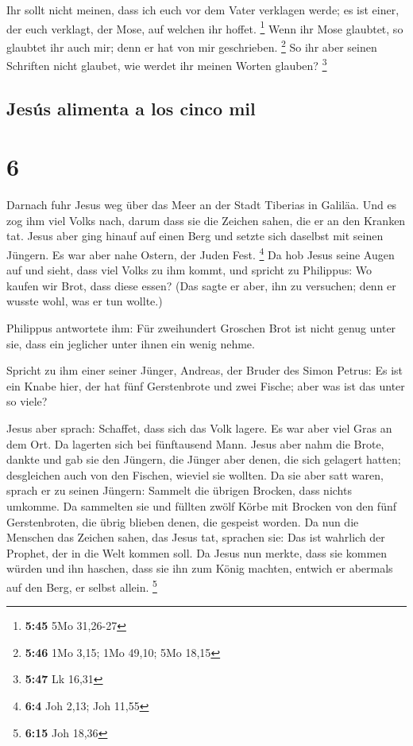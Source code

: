  Ihr sollt nicht meinen, dass ich euch vor dem Vater
verklagen werde; es ist einer, der euch verklagt, der Mose, auf welchen
ihr hoffet. \footnote{\textbf{5:45} 5Mo 31,26-27}  Wenn
ihr Mose glaubtet, so glaubtet ihr auch mir; denn er hat von mir
geschrieben. \footnote{\textbf{5:46} 1Mo 3,15; 1Mo 49,10; 5Mo 18,15}
 So ihr aber seinen Schriften nicht glaubet, wie werdet
ihr meinen Worten glauben? \footnote{\textbf{5:47} Lk 16,31}

\hypertarget{jesuxfas-alimenta-a-los-cinco-mil}{%
\subsection{Jesús alimenta a los cinco
mil}\label{jesuxfas-alimenta-a-los-cinco-mil}}

\hypertarget{section-5}{%
\section{6}\label{section-5}}

 Darnach fuhr Jesus weg über das Meer an der Stadt
Tiberias in Galiläa.  Und es zog ihm viel Volks nach,
darum dass sie die Zeichen sahen, die er an den Kranken tat.
 Jesus aber ging hinauf auf einen Berg und setzte sich
daselbst mit seinen Jüngern.  Es war aber nahe Ostern, der
Juden Fest. \footnote{\textbf{6:4} Joh 2,13; Joh 11,55} 
Da hob Jesus seine Augen auf und sieht, dass viel Volks zu ihm kommt,
und spricht zu Philippus: Wo kaufen wir Brot, dass diese essen?
 (Das sagte er aber, ihn zu versuchen; denn er wusste
wohl, was er tun wollte.)

 Philippus antwortete ihm: Für zweihundert Groschen Brot
ist nicht genug unter sie, dass ein jeglicher unter ihnen ein wenig
nehme.

 Spricht zu ihm einer seiner Jünger, Andreas, der Bruder
des Simon Petrus:  Es ist ein Knabe hier, der hat fünf
Gerstenbrote und zwei Fische; aber was ist das unter so viele?

 Jesus aber sprach: Schaffet, dass sich das Volk lagere.
Es war aber viel Gras an dem Ort. Da lagerten sich bei fünftausend Mann.
 Jesus aber nahm die Brote, dankte und gab sie den
Jüngern, die Jünger aber denen, die sich gelagert hatten; desgleichen
auch von den Fischen, wieviel sie wollten.  Da sie aber
satt waren, sprach er zu seinen Jüngern: Sammelt die übrigen Brocken,
dass nichts umkomme.  Da sammelten sie und füllten zwölf
Körbe mit Brocken von den fünf Gerstenbroten, die übrig blieben denen,
die gespeist worden.  Da nun die Menschen das Zeichen
sahen, das Jesus tat, sprachen sie: Das ist wahrlich der Prophet, der in
die Welt kommen soll.  Da Jesus nun merkte, dass sie
kommen würden und ihn haschen, dass sie ihn zum König machten, entwich
er abermals auf den Berg, er selbst allein. \footnote{\textbf{6:15} Joh
  18,36}

